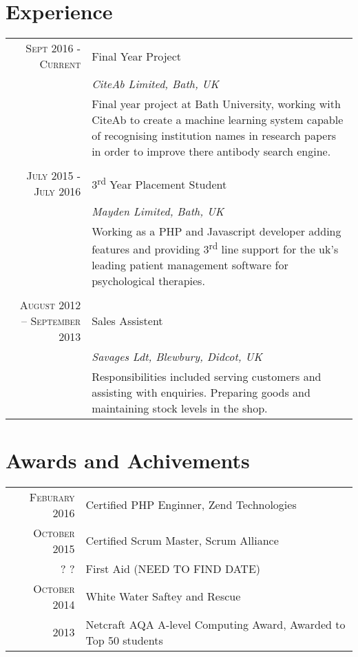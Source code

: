 \documentclass[a4paper,10pt]{article}
\begin{document}
\section{Experience}
\begin{tabular}{r|p{11cm}}
\textsc{Sept} 2016 - \textsc{Current} & Final Year Project \\&\emph{CiteAb Limited, Bath, UK}\\&\footnotesize{Final year project at Bath University, working with CiteAb to create a machine learning system capable of recognising institution names
in research papers in order to improve there antibody search engine.}\\\multicolumn{2}{c}{} \\

\textsc{July} 2015 - \textsc{July} 2016 & 3\textsuperscript{rd} Year Placement Student \\&\emph{Mayden Limited, Bath, UK}\\&\footnotesize{Working as a PHP and Javascript developer adding features and providing 3\textsuperscript{rd} line support for the uk's leading patient management software for psychological therapies.}\\\multicolumn{2}{c}{} \\
\textsc{August} 2012 – \textsc{September} 2013 & Sales Assistent\\&\emph{Savages Ldt, Blewbury, Didcot, UK}\\&\footnotesize{Responsibilities included serving customers and assisting with enquiries. Preparing goods and maintaining stock levels in the shop.  }\\
\end{tabular}

\section{Awards and Achivements}
\begin{tabular}{rl}
 \textsc{Feburary} 2016 & Certified PHP Enginner, Zend Technologies\\
 \textsc{October} 2015 & Certified Scrum Master, Scrum Alliance\\
 \textsc{?} ? & First Aid (NEED TO FIND DATE)\\
 \textsc{October} 2014 & White Water Saftey and Rescue\\
 \textsc{} 2013 & Netcraft AQA A-level Computing Award, Awarded to Top 50 students\\
\end{tabular}
\end{document}
